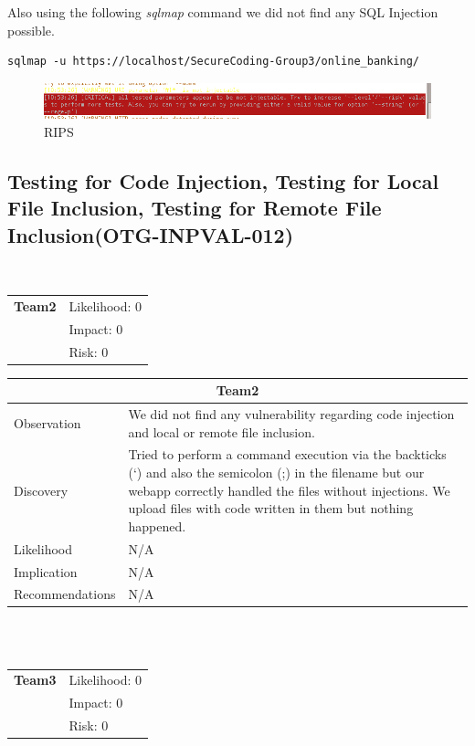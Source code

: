 \documentclass[headsepline,footsepline,footinclude=false,oneside,fontsize=11pt,paper=a4,listof=totoc,bibliography=totoc]{scrbook} %
\begin{document}
Also using the following \textit{sqlmap} command we did not find any SQL Injection possible.\\

\begin{lstlisting}
sqlmap -u https://localhost/SecureCoding-Group3/online_banking/
\end{lstlisting}
\begin{figure}[ht!]
	\centering
	\includegraphics[width=150mm]{logos/sql.jpg}
	\caption{RIPS \label{overflow}}
\end{figure}



 
\pagebreak
\subsection{Testing for Code Injection, Testing for Local File Inclusion, Testing for Remote File Inclusion(OTG-INPVAL-012)}\

\begin{tabular}{cR{12cm}}
	\textbf{Team2} & Likelihood: 0\\& Impact: 0\\& Risk: 0
\end{tabular}

\begin{tabular}{ l|p{11cm}  }
	\hline
	\multicolumn{2}{c}{\textbf{Team2}} \\
	\hline
	Observation   & We did not find any vulnerability regarding code injection and local or remote file inclusion.  \\
	Discovery  & Tried to perform a command execution via the backticks (`) and also the semicolon (;) in the filename but our	webapp correctly handled the files without injections. We upload files with code written in them but nothing happened. \\
	Likelihood & N/A \\
	Implication    & N/A \\
	Recommendations & N/A \\ 
	\hline
\end{tabular}
\\
\vspace{0.5cm}
\\
\begin{tabular}{cR{12cm}}
	\textbf{Team3} & Likelihood: 0\\& Impact: 0\\& Risk: 0
\end{tabular}
\end{document}
